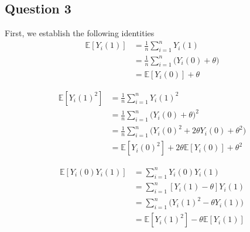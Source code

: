 \documentclass[
  11pt,
  letterpaper,
  DIV=11,
  numbers=noendperiod]{scrartcl}
\begin{document}
\hypertarget{question-3}{%
\subsection{Question 3}\label{question-3}}

First, we establish the following identities \[
\begin{aligned}
\mathbb{E}[Y_i(1)] &= \frac{1}{n}\sum_{i = 1}^n Y_i(1) \\
&= \frac{1}{n}\sum_{i = 1}^n \biggr(Y_i(0) + \theta\biggr) \\
&= \mathbb{E}[Y_i(0)] + \theta
\end{aligned}
\]

\[
\begin{aligned}
\mathbb{E}[Y_i(1)^2] &= \frac{1}{n}\sum_{i = 1}^n Y_i(1)^2 \\
&= \frac{1}{n}\sum_{i = 1}^n \biggr(Y_i(0) + \theta\biggr)^2 \\
&= \frac{1}{n}\sum_{i = 1}^n \biggr(Y_i(0)^2 + 2\theta Y_i(0) +  \theta^2\biggr) \\
&= \mathbb{E}[Y_i(0)^2] +  2\theta\mathbb{E}[Y_i(0)] + \theta^2
\end{aligned}
\]

\[
\begin{aligned}
\mathbb{E}[Y_i(0)Y_i(1)] &= \sum_{i = 1}^n Y_i(0)Y_i(1) \\
&= \sum_{i = 1}^n [Y_i(1) - \theta]Y_i(1) \\
&= \sum_{i = 1}^n \biggr(Y_i(1)^2 - \theta Y_i(1)\biggr) \\
&= \mathbb{E}[Y_i(1)^2] - \theta\mathbb{E}[Y_i(1)]
\end{aligned}
\]
\end{document}
